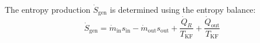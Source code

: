 The entropy production \( \dot{S}_{\text{gen}} \) is determined using the entropy balance:  
\[
\dot{S}_{\text{gen}} = \dot{m}_{\text{in}} s_{\text{in}} - \dot{m}_{\text{out}} s_{\text{out}} + \frac{\dot{Q}_R}{T_{\text{KF}}} + \frac{\dot{Q}_{\text{out}}}{T_{\text{KF}}}
\]